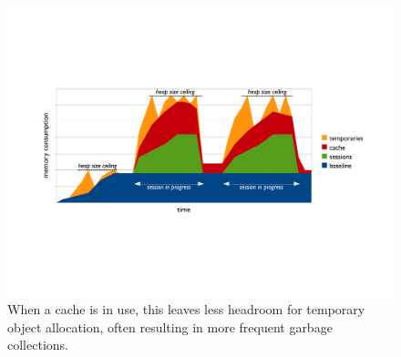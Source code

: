 \begin{figure}
	\centering
	\includegraphics[width=\textwidth]{part4/Figures/lifetime/timeline-base-session-temps-with-cache}
	\caption{When a cache is in use, this leaves less headroom for temporary
	object allocation, often resulting in more frequent garbage collections.}
	\label{fig:timeline-base-session-temps-with-cache}
\end{figure}







